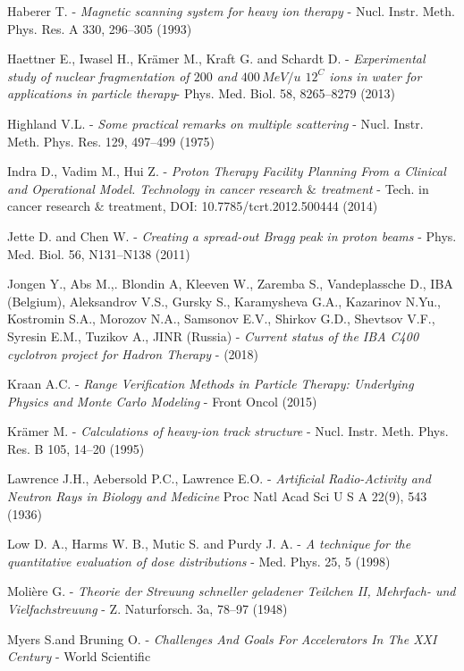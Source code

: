 \documentclass[12pt, a4paper, twoside]{book}
\begin{document}
\begin{thebibliography}{99}
Haberer T. - 
\emph{Magnetic scanning system for heavy ion therapy} -
Nucl. Instr. Meth. Phys. Res. A 330, 296–305 (1993)

Haettner E., Iwasel H., Krämer M., Kraft G. and Schardt D. -
\emph{Experimental study of nuclear fragmentation of $200$ and $400\,MeV/u$ ${12}^C$ ions in water for applications in particle therapy}-
Phys. Med. Biol. 58, 8265–8279 (2013)

Highland V.L. -
\emph{Some practical remarks on multiple scattering} -
Nucl. Instr. Meth. Phys. Res. 129, 497–499 (1975)

Indra D., Vadim M., Hui Z. -
\emph{Proton Therapy Facility Planning From a Clinical and Operational Model. Technology in cancer research $\&$ treatment} -
Tech. in cancer research $\&$ treatment, DOI: 10.7785/tcrt.2012.500444 (2014)

Jette D. and Chen W. - 
\emph{Creating a spread-out Bragg peak in proton beams} -
Phys. Med. Biol. 56, N131–N138 (2011)

Jongen Y., Abs M.,. Blondin A, Kleeven W., Zaremba S., Vandeplassche D., IBA (Belgium), Aleksandrov V.S., Gursky S., Karamysheva G.A., Kazarinov N.Yu., Kostromin S.A., Morozov N.A., Samsonov E.V., Shirkov G.D., Shevtsov V.F., Syresin E.M., Tuzikov A., JINR (Russia) - 
\emph{Current status of the IBA C400 cyclotron project for Hadron Therapy} - 
(2018)

Kraan A.C. -
\emph{Range Verification Methods in Particle Therapy: Underlying Physics and Monte Carlo Modeling} - 
Front Oncol (2015)

Krämer M. - 
\emph{Calculations of heavy-ion track structure} - 
Nucl. Instr. Meth. Phys. Res. B 105, 14–20 (1995)

Lawrence J.H., Aebersold P.C., Lawrence E.O. -
\emph{Artificial Radio-Activity and Neutron Rays in Biology and Medicine}
Proc Natl Acad Sci U S A 22(9), 543 (1936)

Low D. A., Harms W. B., Mutic S. and Purdy J. A. -
\emph{A technique for the quantitative evaluation of dose distributions} -
Med. Phys. 25, 5 (1998)

Molière G. -
\emph{Theorie der Streuung schneller geladener Teilchen II, Mehrfach- und Vielfachstreuung} - 
Z. Naturforsch. 3a, 78–97 (1948)

Myers S.and  Bruning O. -
\emph{Challenges And Goals For Accelerators In The XXI Century} -
World Scientific


\end{thebibliography}
\end{document}
